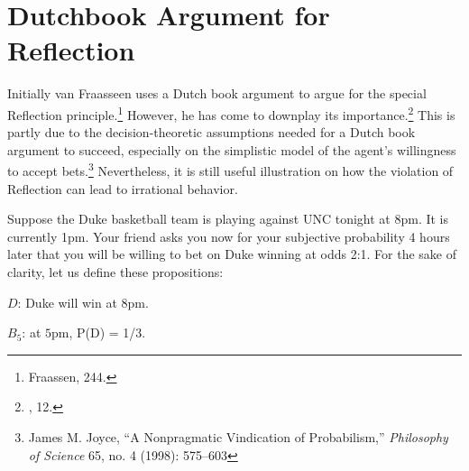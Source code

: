 \hypertarget{dutchbook-argument-for-reflection}{%
\section{Dutchbook Argument for
Reflection}\label{dutchbook-argument-for-reflection}}


Initially van Fraasseen uses a Dutch book argument to argue for the
special Reflection principle.\footnote{Fraassen, 244.} However, he has
come to downplay its importance.\footnote{\cite{beliefuly}, 12.} This is partly due to
the decision-theoretic assumptions needed for a Dutch book argument to
succeed, especially on the simplistic model of the agent's willingness
to accept bets.\footnote{James M. Joyce, ``A Nonpragmatic Vindication of
  Probabilism,'' \emph{Philosophy of Science} 65, no. 4 (1998): 575--603}
Nevertheless, it is still useful illustration on how the violation of
Reflection can lead to irrational behavior.

Suppose the Duke basketball team is playing against UNC tonight at 8pm.
It is currently 1pm. Your friend asks you now for your subjective
probability 4 hours later that you will be willing to bet on Duke
winning at odds 2:1. For the sake of clarity, let us define these
propositions:

\begin{centering}

$D$: Duke will win at 8pm. 

$B_{5}$: at $5$pm, P(D) = 1/3.

\end{centering}

